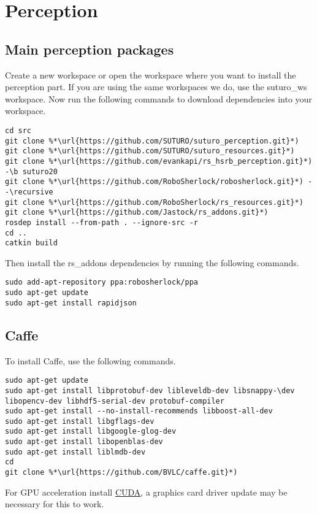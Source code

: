 \documentclass[main.tex]{subfiles}
\begin{document}
 \section{Perception}
 \subsection{Main perception packages}
 Create a new workspace or open the workspace where you want to install the perception part. If you are using the same workspaces we do, use the suturo\_ws workspace. Now run the following commands to download dependencies into your workspace.
 
 \begin{lstlisting}
cd src
git clone %*\url{https://github.com/SUTURO/suturo_perception.git}*)
git clone %*\url{https://github.com/SUTURO/suturo_resources.git}*) 
git clone %*\url{https://github.com/evankapi/rs_hsrb_perception.git}*) -\b suturo20
git clone %*\url{https://github.com/RoboSherlock/robosherlock.git}*) --\recursive
git clone %*\url{https://github.com/RoboSherlock/rs_resources.git}*)
git clone %*\url{https://github.com/Jastock/rs_addons.git}*)
rosdep install --from-path . --ignore-src -r 
cd ..
catkin build
\end{lstlisting}
 
 Then install the rs\_addons dependencies by running the following commands.
 \begin{lstlisting}
sudo add-apt-repository ppa:robosherlock/ppa
sudo apt-get update
sudo apt-get install rapidjson 
\end{lstlisting}
 
\subsection{Caffe}
To install Caffe, use the following commands.
 \begin{lstlisting}
sudo apt-get update
sudo apt-get install libprotobuf-dev libleveldb-dev libsnappy-\dev libopencv-dev libhdf5-serial-dev protobuf-compiler
sudo apt-get install --no-install-recommends libboost-all-dev
sudo apt-get install libgflags-dev
sudo apt-get install libgoogle-glog-dev
sudo apt-get install libopenblas-dev
sudo apt-get install liblmdb-dev
cd 
git clone %*\url{https://github.com/BVLC/caffe.git}*)
\end{lstlisting}
 
 For GPU acceleration install \href{https://docs.nvidia.com/cuda/cuda-installation-guide-linux/index.html#ubuntu-installation}{CUDA}, a graphics card driver update may be necessary for this to work.
 
\end{document}
